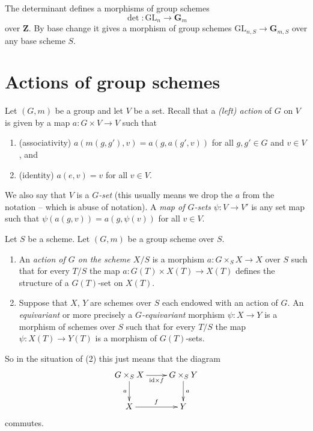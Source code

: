 \begin{example}
\label{example-determinant}
The determinant defines a morphisms of group schemes
$$
\det : \text{GL}_n \longrightarrow \mathbf{G}_m
$$
over $\mathbf{Z}$. By base change it gives a morphism
of group schemes $\text{GL}_{n, S} \to \mathbf{G}_{m, S}$
over any base scheme $S$.
\end{example}





\section{Actions of group schemes}
\label{section-action-grou-scheme}

\noindent
Let $(G, m)$ be a group and let $V$ be a set.
Recall that a {\it (left) action} of $G$ on $V$ is given
by a map $a : G \times V \to V$ such that
\begin{enumerate}
\item (associativity) $a(m(g, g'), v) = a(g, a(g', v))$ for all
$g, g' \in G$ and $v \in V$, and
\item (identity) $a(e, v) = v$ for all $v \in V$.
\end{enumerate}
We also say that $V$ is a {\it $G$-set} (this usually means we
drop the $a$ from the notation -- which is abuse of notation).
A {\it map of $G$-sets} $\psi : V \to V'$ is any set map
such that $\psi(a(g, v)) = a(g, \psi(v))$ for all $v \in V$.

\begin{definition}
\label{definition-action-group-scheme}
Let $S$ be a scheme. Let $(G, m)$ be a group scheme over $S$.
\begin{enumerate}
\item An {\it action of $G$ on the scheme $X/S$} is
a morphism $a : G \times_S X \to X$ over $S$ such that
for every $T/S$ the map $a : G(T) \times X(T) \to X(T)$
defines the structure of a $G(T)$-set on $X(T)$.
\item Suppose that $X$, $Y$ are schemes over $S$ each endowed
with an action of $G$. An {\it equivariant} or more precisely
a {\it $G$-equivariant} morphism $\psi : X \to Y$
is a morphism of schemes over $S$ such
that for every $T/S$ the map $\psi : X(T) \to Y(T)$ is
a morphism of $G(T)$-sets.
\end{enumerate}
\end{definition}

\noindent
So in the situation of (2) this just means that the diagram
$$
\xymatrix{
G \times_S X \ar[r]_-{\text{id} \times f} \ar[d]_a &
G \times_S Y \ar[d]^a \\
X \ar[r]^f & Y
}
$$
commutes.




